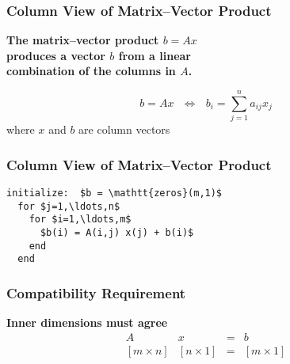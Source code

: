 \documentclass[10pt]{beamer}
\newcommand{\matdim}[2]{\ensuremath{#1\times#2}}
\begin{document}
\begin{frame}
\frametitle{Column View of Matrix--Vector Product}

\begin{center}
\begin{minipage}{4.75in}
    \bfseries
    The matrix--vector product $b = Ax$ \\
    produces a vector $b$ from a linear \\
    combination of the columns in $A$.
\end{minipage}
\end{center}

\begin{equation*}
    b = A x\ \ \ \Longleftrightarrow
           \ \ \ b_i = \sum_{j=1}^{n}{ a_{ij} x_j }
\end{equation*}
where $x$ and $b$ are column vectors


\end{frame}
\begin{frame}[fragile]
\frametitle{Column View of Matrix--Vector Product}

\begin{lstlisting}[mathescape,caption=Matrix--Vector Multiplication by Columns,label=algo:MatVecCol]
  initialize:  $b = \mathtt{zeros}(m,1)$       
  for $j=1,\ldots,n$      
    for $i=1,\ldots,m$        
      $b(i) = A(i,j) x(j) + b(i)$  
    end                     
  end
\end{lstlisting}

\end{frame}
\begin{frame}
\frametitle{Compatibility Requirement}

\textbf{Inner dimensions must agree}
\begin{equation*}
    \begin{array}{cccc}
                A       &        x        & = & b \\[3pt]
        [\matdim{m}{n}] & [\matdim{n}{1}] & = & [\matdim{m}{1}]
    \end{array}
\end{equation*}


\end{frame}
\end{document}
